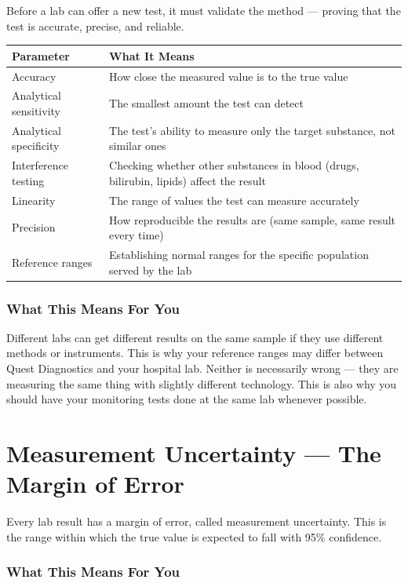 Before a lab can offer a new test, it must validate the method --- proving that the test is accurate, precise, and reliable.

\begin{longtable}{@{}ll@{}}
\toprule
\textbf{Parameter} & \textbf{What It Means} \\
\midrule
Accuracy & How close the measured value is to the true value \\
Analytical sensitivity & The smallest amount the test can detect \\
Analytical specificity & The test's ability to measure only the target substance, not similar ones \\
Interference testing & Checking whether other substances in blood (drugs, bilirubin, lipids) affect the result \\
Linearity & The range of values the test can measure accurately \\
Precision & How reproducible the results are (same sample, same result every time) \\
Reference ranges & Establishing normal ranges for the specific population served by the lab \\
\bottomrule
\end{longtable}

\subsubsection{What This Means For You}

Different labs can get different results on the same sample if they use different methods or instruments. This is why your reference ranges may differ between Quest Diagnostics and your hospital lab. Neither is necessarily wrong --- they are measuring the same thing with slightly different technology. This is also why you should have your monitoring tests done at the same lab whenever possible.

\clearpage
\section{Measurement Uncertainty --- The Margin of Error}

Every lab result has a margin of error, called measurement uncertainty. This is the range within which the true value is expected to fall with 95\% confidence.

\subsubsection{What This Means For You}


